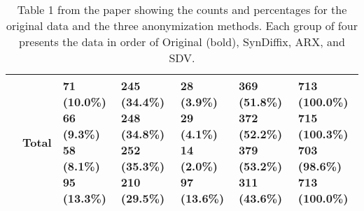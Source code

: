 \begin{table}
\begin{center}
\begin{small}
\begin{tabular}{lllllll}
& Total      & \makecell[l]{\textbf{71 (10.0\%)} \\66 (9.3\%) \\58 (8.1\%) \\95 (13.3\%) \\}      & \makecell[l]{\textbf{245 (34.4\%)} \\248 (34.8\%) \\252 (35.3\%) \\210 (29.5\%) \\}      & \makecell[l]{\textbf{28 (3.9\%)} \\29 (4.1\%) \\14 (2.0\%) \\97 (13.6\%) \\}      & \makecell[l]{\textbf{369 (51.8\%)} \\372 (52.2\%) \\379 (53.2\%) \\311 (43.6\%) \\}      & \makecell[l]{\textbf{713 (100.0\%)} \\715 (100.3\%)  \\703 (98.6\%)  \\713 (100.0\%)  \\} \\ 

      \bottomrule
      \end{tabular}
      \end{small}
      \caption{Table 1 from the paper showing the counts and percentages for the original data and the three anonymization methods. Each group of four presents the data in order of Original (bold), SynDiffix, ARX, and SDV.}
      \label{tab:table1}
      \end{center}
      \end{table}
    